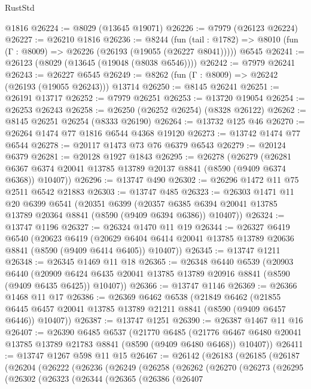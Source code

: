 \begin{lexlean}{RustStd}
\begin{coremodule}
    @1816
@26224 := @8029 (@13645 @19071)
@26226 := @7979 (@26123 @26224)
@26227 := @26210 @1816
@26236 := @8244
    (fun (tail : @1782) => @8010 (fun (Γ : @8009) => @26226 (@26193 (@19055 (@26227 @8041)))))
    @6545
@26241 := @26123 (@8029 (@13645 (@19048 (@8038 @6546))))
@26242 := @7979 @26241
@26243 := @26227 @6545
@26249 := @8262 (fun (Γ : @8009) => @26242 (@26193 (@19055 @26243))) @13714
@26250 := @8145 @26241
@26251 := @26191 @13717
@26252 := @7979 @26251
@26253 := @13720 @19054
@26254 := @26253 @26243
@26258 := @26250 (@26252 @26254) (@8328 @26122)
@26262 := @8145 @26251 @26254 (@8333 @26190)
@26264 := @13732 @125 @46
@26270 := @26264 @1474 @77 @1816 @6544 @4368 @19120
@26273 := @13742 @1474 @77 @6544
@26278 := @20117 @1473 @73 @76 @6379 @6543
@26279 := @20124 @6379
@26281 := @20128 @1927 @1843
@26295 := @26278
    (@26279
      (@26281 @6367 @6374 @20041 @13785 @13789 @20137 @8841 (@8590 (@9409 @6374 @6368)) @10407))
@26296 := @13747 @490
@26302 := @26296 @1472 @11 @75 @2511 @6542 @21883
@26303 := @13747 @485
@26323 := @26303
    @1471
    @11
    @20
    @6399
    @6541
    (@20351
      @6399
      (@20357 @6385 @6394 @20041 @13785 @13789 @20364 @8841 (@8590 (@9409 @6394 @6386)) @10407))
@26324 := @13747 @1196
@26327 := @26324 @1470 @11 @19
@26344 := @26327
    @6419
    @6540
    (@20623
      @6419
      (@20629 @6404 @6414 @20041 @13785 @13789 @20636 @8841 (@8590 (@9409 @6414 @6405)) @10407))
@26345 := @13747 @1211
@26348 := @26345 @1469 @11 @18
@26365 := @26348
    @6440
    @6539
    (@20903
      @6440
      (@20909 @6424 @6435 @20041 @13785 @13789 @20916 @8841 (@8590 (@9409 @6435 @6425)) @10407))
@26366 := @13747 @1146
@26369 := @26366 @1468 @11 @17
@26386 := @26369
    @6462
    @6538
    (@21849
      @6462
      (@21855 @6445 @6457 @20041 @13785 @13789 @21211 @8841 (@8590 (@9409 @6457 @6446)) @10407))
@26387 := @13747 @1251
@26390 := @26387 @1467 @11 @16
@26407 := @26390
    @6485
    @6537
    (@21770
      @6485
      (@21776 @6467 @6480 @20041 @13785 @13789 @21783 @8841 (@8590 (@9409 @6480 @6468)) @10407))
@26411 := @13747 @1267 @598 @11 @15
@26467 := @26142
    (@26183
      (@26185
        (@26187
          (@26204
            (@26222
              (@26236
                (@26249
                  (@26258
                    (@26262
                      (@26270
                        (@26273
                          (@26295
                            (@26302
                              (@26323
                                (@26344
                                  (@26365
                                    (@26386
                                      (@26407

\end{coremodule}
\end{lexlean}

